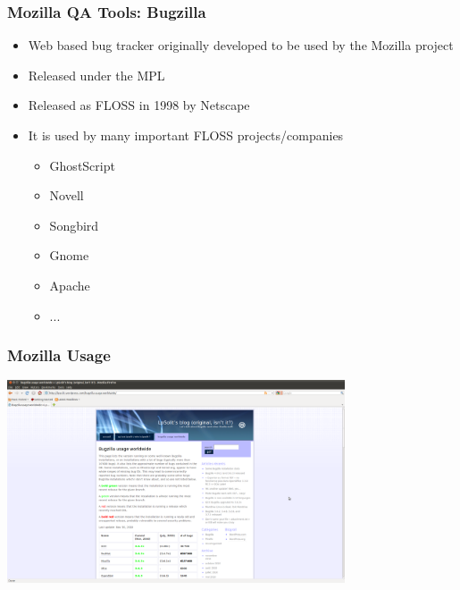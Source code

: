 \documentclass{beamer}
\begin{document}
\begin{frame}
 \frametitle{Mozilla QA Tools: Bugzilla}
 \begin{itemize}
 \item Web based bug tracker originally developed to be used by the Mozilla project
 \item Released under the MPL
 \item Released as FLOSS in 1998 by Netscape
 \item It is used by many important FLOSS projects/companies
    \begin{itemize}
    \item GhostScript
    \item Novell
    \item Songbird
    \item Gnome
    \item Apache
    \item ...
    \end{itemize}
 \end{itemize}
\end{frame}


\begin{frame}
\frametitle{Mozilla Usage}
\begin{center}
 \includegraphics[height=6cm]{figs/Bugzilla_usage_worldwide.png}
\begin{figure}
\end{figure}
\end{center}
\end{frame}

\end{document}
